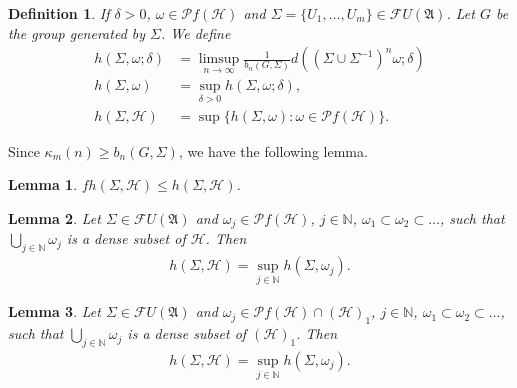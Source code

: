 \documentclass[a4paper,10pt]{amsart}
\newtheorem{definition}{Definition}[section]
\newtheorem{lemma}{Lemma}[section]
\newcommand{\AAA}{\mathfrak A}
\newcommand{\HHH}{\mathscr H} %
\newcommand{\PP}{\mathscr P}
\newcommand{\FF}{\mathscr F}
\newcommand{\N}{\mathbb N} %
\begin{document}
\begin{definition}
    If $\delta > 0$, $\omega \in \PP f(\HHH)$ and 
    $\Sigma = \{U_1, \ldots, U_m \} \in 
    \FF U(\AAA)$. Let $G$ be the group generated by
    $\Sigma$. We define
    \begin{align*}
        h(\Sigma, \omega; \delta) &=
           \limsup\limits_{n \rightarrow \infty}
           \frac{1}{b_{n}(G, \Sigma)}d\left 
           ((\Sigma \cup \Sigma^{-1})^{n}\omega
            ; \delta \right ) \\
        h(\Sigma, \omega) &= \sup_{\delta > 0}h(\Sigma, \omega; \delta),\\
        h(\Sigma, \HHH) &= \sup\{h(\Sigma, \omega): \omega \in \PP f(\HHH)\}.
    \end{align*}
\end{definition}

Since $\kappa_{m}(n) \geq b_{n}(G, \Sigma)$, we have the following lemma.

\begin{lemma} \label{e_l1}
    $fh(\Sigma, \HHH) \leq h(\Sigma, \HHH)$.
\end{lemma}

\begin{lemma} \label{e_l2}
    Let $\Sigma \in \FF U(\AAA)$ and 
    $\omega_j \in \PP f(\HHH)$, $j \in \N$, 
    $\omega_1 \subset \omega_2
    \subset \ldots$, such that $
    \bigcup_{j \in \N}\omega_{j}$ 
    is a dense subset of 
    $\HHH$. Then
    \begin{align*}
        h(\Sigma, \HHH) = \sup_{j \in \N}h(\Sigma, \omega_{j}).
    \end{align*}
\end{lemma}

\begin{lemma} \label{e_l3}
    Let $\Sigma \in \FF U(\AAA)$ and 
    $\omega_j \in \PP f(\HHH) \cap (\HHH)_{1}$, $j \in \N$, 
    $\omega_1 \subset \omega_2
    \subset \ldots$, such that $
    \bigcup_{j \in \N}\omega_{j}$
    is a dense subset of 
    $(\HHH)_{1}$. Then
    \begin{align*}
        h(\Sigma, \HHH) = \sup_{j \in \N}h(\Sigma, \omega_{j}).
    \end{align*}
\end{lemma}
\end{document}
